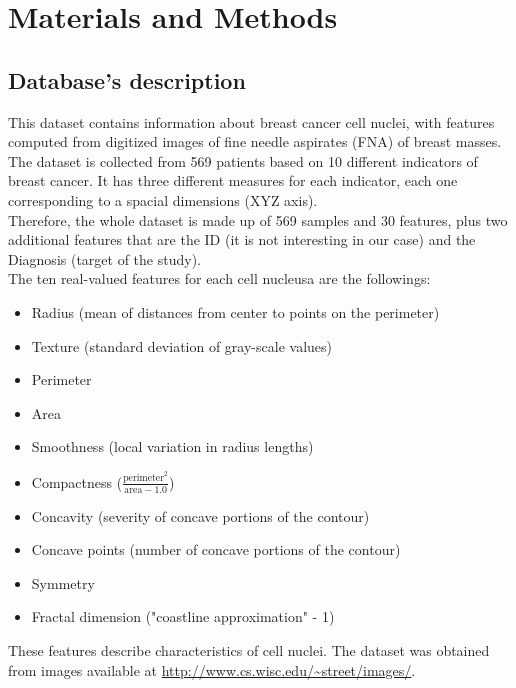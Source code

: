 \documentclass[10pt,a4paper]{article}
\theoremstyle{definition}
\theoremstyle{definition}
\begin{document}
\newpage

\section{Materials and Methods}

\subsection{Database's description}

This dataset contains information about breast cancer cell nuclei, with features computed from digitized images of fine needle aspirates (FNA) of breast masses. The dataset is collected from 569 patients based on 10 different indicators of breast cancer. It has three different measures for each indicator, each one corresponding to a spacial dimensions (XYZ axis). \\

Therefore, the whole dataset  is made up of 569 samples and 30 features, plus two additional features that are the ID (it is not interesting in our case) and the Diagnosis (target of the study).\\


The ten real-valued features for each cell nucleusa are the followings: \\

\begin{itemize}
	\item Radius (mean of distances from center to points on the perimeter)
	\item Texture (standard deviation of gray-scale values)
	\item Perimeter
	\item Area
	\item Smoothness (local variation in radius lengths)
	\item Compactness ($\frac{\text{perimeter}^2}{\text{area} - 1.0}$)
	\item Concavity (severity of concave portions of the contour)
	\item Concave points (number of concave portions of the contour)
	\item Symmetry
	\item Fractal dimension ("coastline approximation" - 1)
\end{itemize}


These features describe characteristics of cell nuclei. The dataset was obtained from images available at \url{http://www.cs.wisc.edu/~street/images/}. \\
\end{document}
